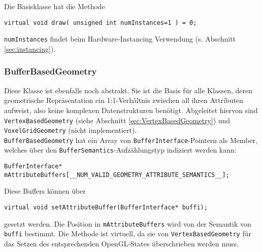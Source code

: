	Die Basisklasse hat die Methode
	\begin{lstlisting}	
virtual void draw( unsigned int numInstances=1 ) = 0;
	\end{lstlisting}
	
	\lstinline|numInstances| findet beim Hardware-Instancing Verwendung (s. Abschnitt \ref{sec:instancing}).
	
	\subsubsection{BufferBasedGeometry}
		Diese Klasse ist ebenfalls noch abstrakt. Sie ist die Basis für alle Klassen, deren geometrische
		Repräsentation ein 1:1-Verhältnis zwischen all ihren Attributen aufweist, also keine komplexen
		Datenstrukturen benötigt. 
		Abgeleitet hiervon sind \lstinline|VertexBasedGeometry| (siehe Abschnitt \ref{sec:VertexBasedGeometry})
		und \lstinline|VoxelGridGeometry| (nicht implementiert).\\
		
		\lstinline|BufferBasedGeometry| hat ein Array von \lstinline|BufferInterface|-Pointern als Member,
		welches über den \lstinline|BufferSemantics|-Aufzählungstyp indiziert werden kann:
		\begin{lstlisting}			
BufferInterface* mAttributeBuffers[__NUM_VALID_GEOMETRY_ATTRIBUTE_SEMANTICS__];
		\end{lstlisting}	
		Diese Buffers können über 
		\begin{lstlisting}			
virtual void setAttributeBuffer(BufferInterface* buffi);
		\end{lstlisting}
		gesetzt werden.  Die Position in \lstinline|mAttributeBuffers| wird von der Semantik von \lstinline|buffi| 
		bestimmt. Die Methode ist virtuell, da sie von \lstinline|VertexBasedGeometry| 
		für das Setzen des entsprechenden OpenGL-States überschrieben werden muss.		
		
